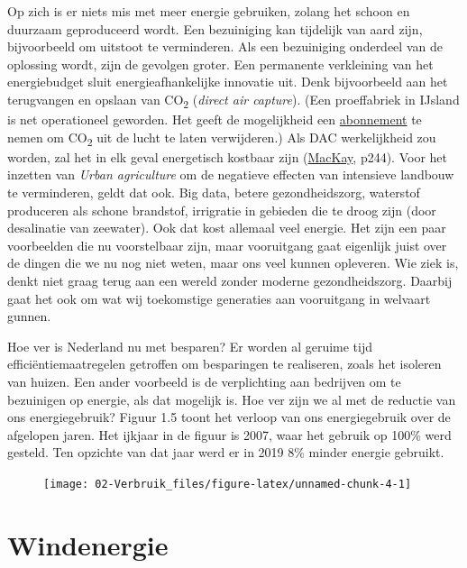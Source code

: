 \documentclass[
  11pt,
  a4paper,
]{book}
\begin{document}
Op zich is er niets mis met meer energie gebruiken, zolang het schoon en duurzaam geproduceerd wordt. Een bezuiniging kan tijdelijk van aard zijn, bijvoorbeeld om uitstoot te verminderen. Als een bezuiniging onderdeel van de oplossing wordt, zijn de gevolgen groter. Een permanente verkleining van het energiebudget sluit energieafhankelijke innovatie uit. Denk bijvoorbeeld aan het terugvangen en opslaan van CO\textsubscript{2} (\emph{direct air capture}). (Een proeffabriek in IJsland is net operationeel geworden. Het geeft de mogelijkheid een \href{https://climeworks.com/subscriptions}{abonnement} te nemen om CO\textsubscript{2} uit de lucht te laten verwijderen.) Als DAC werkelijkheid zou worden, zal het in elk geval energetisch kostbaar zijn (\href{https://www.withouthotair.com/download.html}{MacKay}, p244). Voor het inzetten van \emph{Urban agriculture} om de negatieve effecten van intensieve landbouw te verminderen, geldt dat ook. Big data, betere gezondheidszorg, waterstof produceren als schone brandstof, irrigratie in gebieden die te droog zijn (door desalinatie van zeewater). Ook dat kost allemaal veel energie. Het zijn een paar voorbeelden die nu voorstelbaar zijn, maar vooruitgang gaat eigenlijk juist over de dingen die we nu nog niet weten, maar ons veel kunnen opleveren. Wie ziek is, denkt niet graag terug aan een wereld zonder moderne gezondheidszorg. Daarbij gaat het ook om wat wij toekomstige generaties aan vooruitgang in welvaart gunnen.

Hoe ver is Nederland nu met besparen? Er worden al geruime tijd efficiëntiemaatregelen getroffen om besparingen te realiseren, zoals het isoleren van huizen. Een ander voorbeeld is de verplichting aan bedrijven om te bezuinigen op energie, als dat mogelijk is. Hoe ver zijn we al met de reductie van ons energiegebruik? Figuur 1.5 toont het verloop van ons energiegebruik over de afgelopen jaren. Het ijkjaar in de figuur is 2007, waar het gebruik op 100\% werd gesteld. Ten opzichte van dat jaar werd er in 2019 8\% minder energie gebruikt.

\begin{figure}[!h]

{\centering \texttt{[image: 02-Verbruik\_files/figure-latex/unnamed-chunk-4-1]} 

}

\end{figure}

\hypertarget{windenergie}{%
\chapter{Windenergie}\label{windenergie}}
\end{document}
